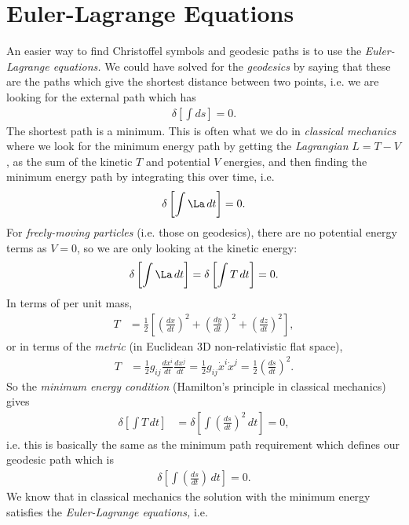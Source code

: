 \documentclass[a4paper, 11pt, normalem]{report}
\begin{document}
\section{Euler-Lagrange Equations}
An easier way to find Christoffel symbols and geodesic paths is to use the \emph{Euler-Lagrange equations.}
We could have solved for the \emph{geodesics} by saying that these are the paths which give the shortest distance between two points, i.e. we are looking for the external path which has
\begin{align}
    \delta\left[\int ds\right] = 0.
\end{align}
The shortest path is a minimum. 
This is often what we do in \emph{classical mechanics} where we look for the minimum energy path by getting the \emph{Lagrangian} $L=T-V$, as the sum of the kinetic $T$ and potential $V$ energies, and then finding the minimum energy path by integrating this over time, i.e.
\begin{align}
    \delta\left[\int \La\,dt\right] = 0.
\end{align}
For \emph{freely-moving particles} (i.e. those on geodesics), there are no potential energy terms as $V=0$, so we are only looking at the kinetic energy:
\begin{align}
    \delta\left[\int \La\,dt\right] = \delta\left[\int T\,dt\right] = 0.
\end{align}
In terms of per unit mass,
\begin{align}
    T &= \frac12\left[\left(\frac{dx}{dt}\right)^2 + \left(\frac{dy}{dt}\right)^2 + \left(\frac{dz}{dt}\right)^2\right],
\end{align}
or in terms of the \emph{metric} (in Euclidean 3D non-relativistic flat space),
\begin{align}
    T &= \frac12g_{ij}\frac{dx^i}{dt}\frac{dx^j}{dt} = \frac12g_{ij}\dot{x}^i\dot{x}^j = \frac12\left(\frac{ds}{dt}\right)^2.
\end{align}
So the \emph{minimum energy condition} (Hamilton's principle in classical mechanics) gives
\begin{align}
    \delta\left[\int T\,dt\right] &= \delta\left[\int \left(\frac{ds}{dt}\right)^2\,dt\right] = 0,
\end{align} 
i.e. this is basically the same as the minimum path requirement which defines our geodesic path which is 
\begin{align}
    \delta\left[\int \left(\frac{ds}{dt}\right)\,dt\right] = 0.
\end{align}
We know that in classical mechanics the solution with the minimum energy satisfies the \emph{Euler-Lagrange equations,} i.e.
\end{document}
